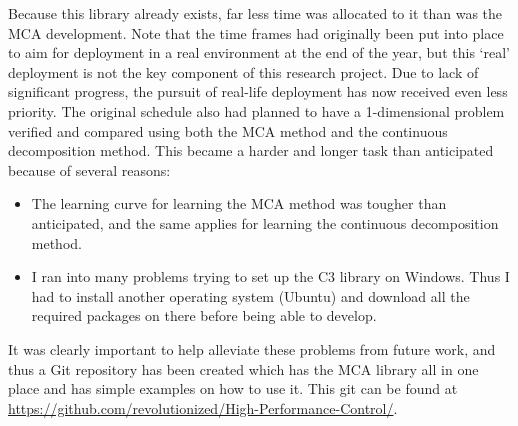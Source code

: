 \documentclass[11pt,draftd]{article}
\begin{document}
\noindent Because this library already exists, far less time was allocated to it than was the MCA development. Note that the time frames had originally been put into place to aim for deployment in a real environment at the end of the year, but this ‘real’ deployment is not the key component of this research project. Due to lack of significant progress, the pursuit of real-life deployment has now received even less priority. The original schedule also had planned to have a 1-dimensional problem verified and compared using both the MCA method and the continuous decomposition method. This became a harder and longer task than anticipated because of several reasons: \\
\begin{itemize}
	\item The learning curve for learning the MCA method was tougher than anticipated, and the same applies for learning the continuous decomposition method.
	\item I ran into many problems trying to set up the C3 library on Windows. Thus I had to install another operating system (Ubuntu) and download all the required packages on there before being able to develop. \\
\end{itemize}
It was clearly important to help alleviate these problems from future work, and thus a Git repository has been created which has the MCA library all in one place and has simple examples on how to use it. This git can be found at \url{https://github.com/revolutionized/High-Performance-Control/}. \\
\end{document}
